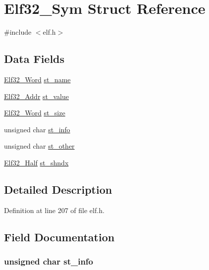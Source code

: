 \hypertarget{struct_elf32___sym}{\section{Elf32\-\_\-\-Sym Struct Reference}
\label{struct_elf32___sym}
}


{\ttfamily \#include $<$elf.\-h$>$}

\subsection*{Data Fields}
\begin{DoxyCompactItemize}
\item 
\hyperlink{elf_8h_af5924ece606c732e86f8263a19408e45}{Elf32\-\_\-\-Word} \hyperlink{struct_elf32___sym_a116d155c3eb6f10b9ebfeea84970eb52}{st\-\_\-name}
\item 
\hyperlink{elf_8h_a40c6d4571e6001f443cc6a6474620158}{Elf32\-\_\-\-Addr} \hyperlink{struct_elf32___sym_ab32ed2a85ba73e6491537c12da094793}{st\-\_\-value}
\item 
\hyperlink{elf_8h_af5924ece606c732e86f8263a19408e45}{Elf32\-\_\-\-Word} \hyperlink{struct_elf32___sym_a11b3bebe7e986b50af68f028d1645f59}{st\-\_\-size}
\item 
unsigned char \hyperlink{struct_elf32___sym_aea2537362e780656ee6de9fe80584a28}{st\-\_\-info}
\item 
unsigned char \hyperlink{struct_elf32___sym_a3985eac957789a1918f606a473461b58}{st\-\_\-other}
\item 
\hyperlink{elf_8h_a2ff0787d7d1bae0f251192806a2974ca}{Elf32\-\_\-\-Half} \hyperlink{struct_elf32___sym_a1454b0a294903ec203d64356c2f0dd69}{st\-\_\-shndx}
\end{DoxyCompactItemize}


\subsection{Detailed Description}


Definition at line 207 of file elf.\-h.



\subsection{Field Documentation}
\hypertarget{struct_elf32___sym_aea2537362e780656ee6de9fe80584a28}{
\subsubsection[{st\-\_\-info}]{\setlength{\rightskip}{0pt plus 5cm}unsigned char st\-\_\-info}}\label{struct_elf32___sym_aea2537362e780656ee6de9fe80584a28}


